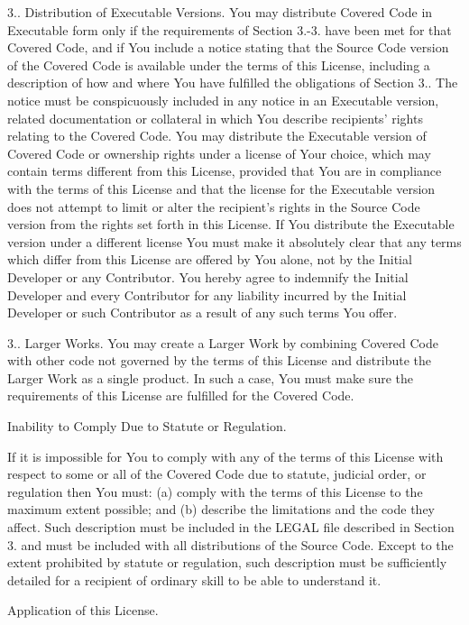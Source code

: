 \begin{DoxyEnumerate}
3.. Distribution of Executable Versions. You may distribute Covered Code in Executable form only if the requirements of Section 3.-\/3. have been met for that Covered Code, and if You include a notice stating that the Source Code version of the Covered Code is available under the terms of this License, including a description of how and where You have fulfilled the obligations of Section 3.. The notice must be conspicuously included in any notice in an Executable version, related documentation or collateral in which You describe recipients' rights relating to the Covered Code. You may distribute the Executable version of Covered Code or ownership rights under a license of Your choice, which may contain terms different from this License, provided that You are in compliance with the terms of this License and that the license for the Executable version does not attempt to limit or alter the recipient's rights in the Source Code version from the rights set forth in this License. If You distribute the Executable version under a different license You must make it absolutely clear that any terms which differ from this License are offered by You alone, not by the Initial Developer or any Contributor. You hereby agree to indemnify the Initial Developer and every Contributor for any liability incurred by the Initial Developer or such Contributor as a result of any such terms You offer.

3.. Larger Works. You may create a Larger Work by combining Covered Code with other code not governed by the terms of this License and distribute the Larger Work as a single product. In such a case, You must make sure the requirements of this License are fulfilled for the Covered Code.
\item Inability to Comply Due to Statute or Regulation.

If it is impossible for You to comply with any of the terms of this License with respect to some or all of the Covered Code due to statute, judicial order, or regulation then You must\-: (a) comply with the terms of this License to the maximum extent possible; and (b) describe the limitations and the code they affect. Such description must be included in the L\-E\-G\-A\-L file described in Section 3. and must be included with all distributions of the Source Code. Except to the extent prohibited by statute or regulation, such description must be sufficiently detailed for a recipient of ordinary skill to be able to understand it.
\item Application of this License.


\end{DoxyEnumerate}
